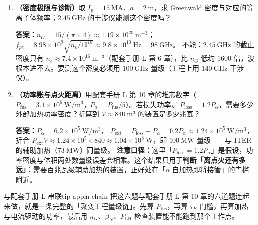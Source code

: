 \begin{enumerate}[leftmargin=1.6em,itemsep=2pt]
\textbf{答案：}$v_\varphi=1.78\times10^{8}\ \mathrm{m/s}$，
$\lambda_\parallel=2\pi v_\varphi/\omega=v_\varphi/f=1.78\times10^{8}/2.45\times10^{9}\approx7.3\ \mathrm{cm}$。
必须做到厘米级（$k_\parallel$ 为几十到几百 $\mathrm{m^{-1}}$），是因为朗道共振要求 $v_\varphi=\omega/k_\parallel$ 落在电子热速度的 $2$--$3$ 倍这个窄窗口内。频率固定时，\textbf{只有 $k_\parallel$ 足够大}才能把相速度压到电子热速度量级。这也是低杂波天线必须用波导阵列精确控制相位的原因。

\item \textbf{（密度极限与诊断）}取 $I_p=15\ \mathrm{MA}$、$a=2\ \mathrm{m}$，求 Greenwald 密度与对应的等离子体频率；$2.45\ \mathrm{GHz}$ 的干涉仪能测这个密度吗？

\textbf{答案：}$n_G=15/(\pi\times4)\approx1.19\times10^{20}\ \mathrm{m^{-3}}$；
$f_{pe}=8.98\times10^{9}\sqrt{n_e/10^{18}}\approx9.8\times10^{10}\ \mathrm{Hz}=98\ \mathrm{GHz}$。
不能：$2.45\ \mathrm{GHz}$ 的截止密度只有 $n_c\approx7.4\times10^{16}\ \mathrm{m^{-3}}$（配套手册 L 第 6 章），比 $n_G$ 低约 $1600$ 倍，波根本进不去。要测这个密度必须用 $100\ \mathrm{GHz}$ 量级（工程上用 $140\ \mathrm{GHz}$ 干涉仪）。

\item \textbf{（功率账与点火距离）}用配套手册 L 第 10 章的堆芯数字（$P_{\mathrm{fus}}=3.1\times10^{6}\ \mathrm{W/m^3}$，$P_\alpha=P_{\mathrm{fus}}/5$）。若损失功率是 $P_{\mathrm{loss}}=1.2P_\alpha$，需要多少外部加热功率密度？折算到 $V\approx840\ \mathrm{m^3}$ 的装置是多少兆瓦？

\textbf{答案：}$P_\alpha=6.2\times10^{5}\ \mathrm{W/m^3}$，
$P_{\mathrm{ext}}=P_{\mathrm{loss}}-P_\alpha=0.2P_\alpha\approx1.24\times10^{5}\ \mathrm{W/m^3}$，
折合 $P_{\mathrm{ext}}V\approx1.24\times10^{5}\times840\approx1.04\times10^{8}\ \mathrm{W}$，即 $100\ \mathrm{MW}$ 量级——与 ITER 的辅助加热（$73\ \mathrm{MW}$）同量级。
\textbf{注意口径：}这里「$P_{\mathrm{loss}}=1.2P_\alpha$」是假设，功率密度与体积两处数量级误差会相乘。这个结果只用于\textbf{判断「离点火还有多远」}：需要百兆瓦级辅助加热的装置，正好处在「$\alpha$ 自加热即将接管」的门槛附近。

\end{enumerate}

\begin{tip}{与配套手册 L 串联}{tip-appm-chain}
把这六题与配套手册 L 第 10 章的六道题连起来做，就是一条完整的「聚变工程量级链」。先算 $P_{\mathrm{fus}}$，再算 $\tau_E$ 门槛，再算加热与电流驱动的功率，最后用 $n_G$、$\beta_N$、$P_{\mathrm{LH}}$ 检查装置能不能跑到那个工作点。
\end{tip}


